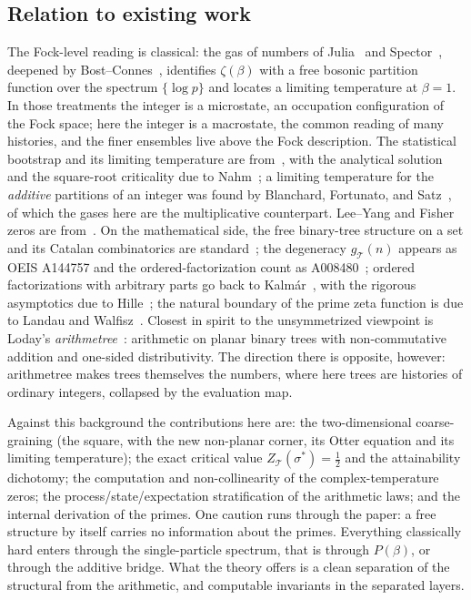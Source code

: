 \documentclass[11pt]{article}
\newcommand{\cT}{\mathcal{T}}   %
\numberwithin{equation}{section}
\theoremstyle{plain}
\theoremstyle{definition}
\theoremstyle{remark}
\begin{document}
\subsection{Relation to existing work}\label{sec:priorart}

The Fock-level reading is classical: the gas of numbers of Julia~\cite{julia} and
Spector~\cite{spector}, deepened by Bost--Connes~\cite{bostconnes}, identifies
$\zeta(\beta)$ with a free bosonic partition function over the spectrum
$\{\log p\}$ and locates a limiting temperature at $\beta = 1$. In those
treatments the integer is a microstate, an occupation configuration of the Fock
space; here the integer is a macrostate, the common reading of many histories,
and the finer ensembles live above the Fock description. The statistical
bootstrap and its limiting temperature are from~\cite{hagedorn,frautschi}, with the
analytical solution and the square-root criticality due to Nahm~\cite{nahm}; a
limiting temperature for the \emph{additive} partitions of an integer was found by
Blanchard, Fortunato, and Satz~\cite{bfs}, of which the gases here are the
multiplicative counterpart.
Lee--Yang and Fisher zeros are from~\cite{leeyang,fisher}. On the mathematical side,
the free binary-tree structure on a set and its Catalan combinatorics are
standard~\cite{stanley}; the
degeneracy $g_\cT(n)$ appears as OEIS A144757 and the ordered-factorization count as
A008480~\cite{oeis}; ordered factorizations with arbitrary parts go back to
Kalm\'ar~\cite{kalmar}, with the rigorous asymptotics due to Hille~\cite{hille};
the natural boundary of the prime zeta function is due to
Landau and Walfisz~\cite{landauwalfisz}. Closest in spirit to the unsymmetrized
viewpoint is Loday's \emph{arithmetree}~\cite{loday,brunoyasaki}: arithmetic on
planar binary trees with non-commutative addition and one-sided distributivity.
The direction there is opposite, however: arithmetree makes trees themselves the
numbers, where here trees are histories of ordinary integers, collapsed by the
evaluation map.

Against this background the contributions here are: the two-dimensional
coarse-graining (the square, with the new non-planar corner, its Otter equation and
its limiting temperature); the exact critical value $Z_\cT(\sigma^{*}) = \tfrac12$
and the attainability dichotomy; the computation and non-collinearity of the
complex-temperature zeros; the process/state/expectation stratification of the
arithmetic laws; and the internal
derivation of the primes. One caution runs through the paper: a free structure by
itself carries no information about the primes. Everything classically hard enters
through the single-particle spectrum, that is through $P(\beta)$, or through
the additive bridge. What the theory offers is a clean separation of the structural
from the arithmetic, and computable invariants in the separated layers.
\end{document}
